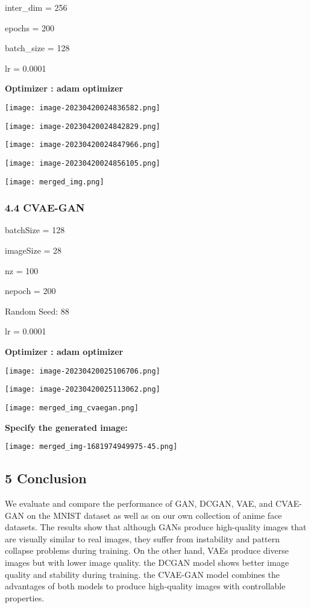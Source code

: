 \documentclass[
]{article}
\begin{document}
inter\_dim = 256

epochs = 200

batch\_size = 128

lr = 0.0001

\textbf{Optimizer : adam optimizer}

\texttt{[image: image-20230420024836582.png]}

\texttt{[image: image-20230420024842829.png]}

\texttt{[image: image-20230420024847966.png]}

\texttt{[image: image-20230420024856105.png]}

\texttt{[image: merged\_img.png]}

\hypertarget{44-cvae-gan}{%
\subsubsection{4.4 CVAE-GAN}\label{44-cvae-gan}}

batchSize = 128

imageSize = 28

nz = 100

nepoch = 200

Random Seed: 88

lr = 0.0001

\textbf{Optimizer : adam optimizer}

\texttt{[image: image-20230420025106706.png]}

\texttt{[image: image-20230420025113062.png]}

\texttt{[image: merged\_img\_cvaegan.png]}

\textbf{Specify the generated image:}

\texttt{[image: merged\_img-1681974949975-45.png]}

\hypertarget{5-conclusion}{%
\subsection{5 Conclusion}\label{5-conclusion}}

We evaluate and compare the performance of GAN, DCGAN, VAE, and CVAE-GAN
on the MNIST dataset as well as on our own collection of anime face
datasets. The results show that although GANs produce high-quality
images that are visually similar to real images, they suffer from
instability and pattern collapse problems during training. On the other
hand, VAEs produce diverse images but with lower image quality. the
DCGAN model shows better image quality and stability during training.
the CVAE-GAN model combines the advantages of both models to produce
high-quality images with controllable properties.
\end{document}

